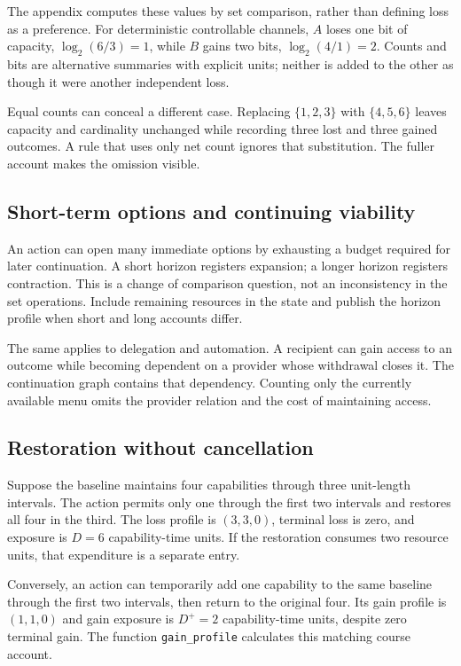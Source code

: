 \documentclass[11pt,a4paper]{article}
\theoremstyle{remark}
\begin{document}
The appendix computes these values by set comparison, rather than defining
loss as a preference. For deterministic controllable channels, $A$ loses one
bit of capacity, $\log_2(6/3)=1$, while $B$ gains two bits,
$\log_2(4/1)=2$. Counts and bits are alternative summaries with explicit units;
neither is added to the other as though it were another independent loss.

Equal counts can conceal a different case. Replacing $\{1,2,3\}$ with
$\{4,5,6\}$ leaves capacity and cardinality unchanged while recording three
lost and three gained outcomes. A rule that uses only net count ignores that
substitution. The fuller account makes the omission visible.

\subsection{Short-term options and continuing viability}

An action can open many immediate options by exhausting a budget required for
later continuation. A short horizon registers expansion; a longer horizon
registers contraction. This is a change of comparison question, not an
inconsistency in the set operations. Include remaining resources in the state
and publish the horizon profile when short and long accounts differ.

The same applies to delegation and automation. A recipient can gain access to
an outcome while becoming dependent on a provider whose withdrawal closes it.
The continuation graph contains that dependency. Counting only the currently
available menu omits the provider relation and the cost of maintaining access.

\subsection{Restoration without cancellation}

Suppose the baseline maintains four capabilities through three unit-length
intervals. The action permits only one through the first two intervals and
restores all four in the third. The loss profile is $(3,3,0)$, terminal loss is
zero, and exposure is $D=6$ capability-time units. If the restoration consumes
two resource units, that expenditure is a separate entry.

Conversely, an action can temporarily add one capability to the same baseline
through the first two intervals, then return to the original four. Its gain
profile is $(1,1,0)$ and gain exposure is $D^+=2$ capability-time units, despite
zero terminal gain. The function \texttt{gain\_profile} calculates this matching
course account.
\end{document}
